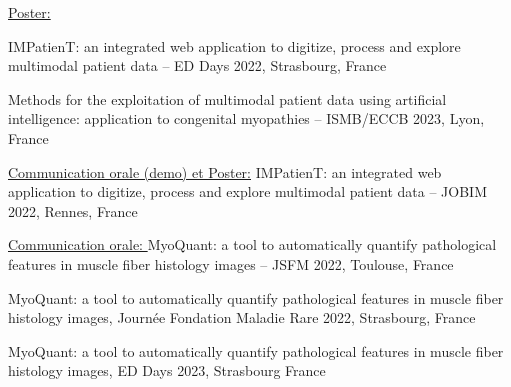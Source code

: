 \underline{Poster:} 

IMPatienT: an integrated web application to digitize, process and explore multimodal patient data – ED Days 2022, Strasbourg, France

Methods for the exploitation of multimodal patient data using artificial intelligence: application to congenital myopathies – ISMB/ECCB 2023, Lyon, France

\underline{Communication orale (demo) et Poster:} IMPatienT: an integrated web application to digitize, process and explore multimodal patient data – JOBIM 2022, Rennes, France

\underline{Communication orale:
}
MyoQuant: a tool to automatically quantify pathological features in muscle fiber histology images – JSFM 2022, Toulouse, France

MyoQuant: a tool to automatically quantify pathological features in muscle fiber histology images, Journée Fondation Maladie Rare 2022, Strasbourg, France

MyoQuant: a tool to automatically quantify pathological features in muscle fiber histology images, ED Days 2023, Strasbourg France
